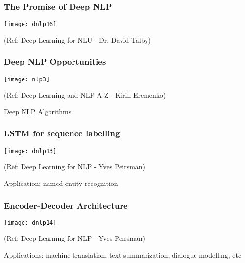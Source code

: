 \begin{frame}[fragile]\frametitle{The Promise of Deep NLP }
\begin{center}
\texttt{[image: dnlp16]}

\tiny{(Ref: Deep Learning for NLU - Dr. David Talby)}
\end{center}

\end{frame}


\begin{frame}[fragile]\frametitle{Deep NLP Opportunities}
\begin{center}
\texttt{[image: nlp3]}

\tiny{(Ref: Deep Learning and NLP A-Z - Kirill Eremenko)}
\end{center}

\end{frame}

\begin{frame}
  \begin{center}
    {\Large Deep NLP Algorithms}
  \end{center}
\end{frame}


\begin{frame}[fragile]\frametitle{ LSTM for sequence labelling}
\begin{center}
\texttt{[image: dnlp13]}

\tiny{(Ref: Deep Learning for NLP - Yves Peirsman)}
\end{center}

Application: named entity recognition
\end{frame}

\begin{frame}[fragile]\frametitle{ Encoder-Decoder Architecture}
\begin{center}
\texttt{[image: dnlp14]}

\tiny{(Ref: Deep Learning for NLP - Yves Peirsman)}
\end{center}

Applications: machine translation, text summarization, dialogue modelling, etc
\end{frame}

